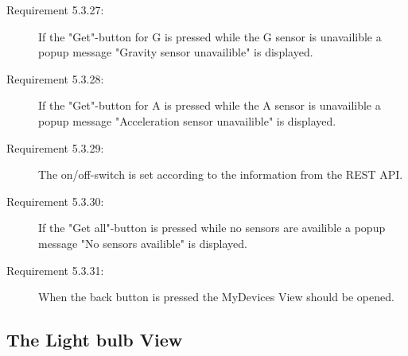 \documentclass[a4paper]{article}
\begin{document}
\begin{description}
\item[Requirement 5.3.27:] If the "Get"-button for G is pressed while the G sensor is unavailible a popup message "Gravity sensor unavailible" is displayed.

\item[Requirement 5.3.28:] If the "Get"-button for A is pressed while the A sensor is unavailible a popup message "Acceleration sensor unavailible" is displayed.

\item[Requirement 5.3.29:] The on/off-switch is set according to the information from the REST API.

\item[Requirement 5.3.30:] If the "Get all"-button is pressed while no sensors are availible a popup message "No sensors availible" is displayed.

\item[Requirement 5.3.31:] When the back button is pressed the MyDevices View should be opened. 

\end{description}


\subsection{The Light bulb View}
\end{document}
